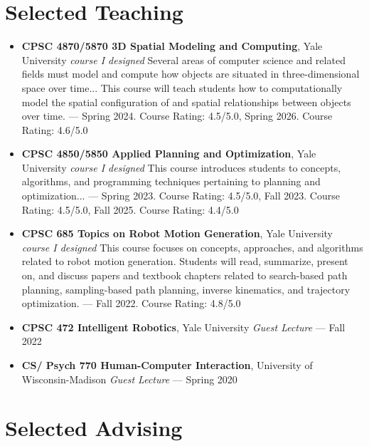 \documentclass[10pt, letterpaper]{article}
\begin{document}
\section*{Selected Teaching}
\begin{itemize}[leftmargin=0pt, label={}, itemsep=0.5em]
    \item \textbf{CPSC 4870/5870 3D Spatial Modeling and Computing}, Yale University \hfill \textit{course I designed}    \newline Several areas of computer science and related fields must model and compute how objects are situated in three-dimensional space over time... This course will teach students how to computationally model the spatial configuration of and spatial relationships between objects over time.                        --- Spring 2024. Course Rating: 4.5/5.0, Spring 2026. Course Rating: 4.6/5.0
                \item \textbf{CPSC 4850/5850 Applied Planning and Optimization}, Yale University \hfill \textit{course I designed}    \newline This course introduces students to concepts, algorithms, and programming techniques pertaining to planning and optimization...                        --- Spring 2023. Course Rating: 4.5/5.0, Fall 2023. Course Rating: 4.5/5.0, Fall 2025. Course Rating: 4.4/5.0
                \item \textbf{CPSC 685 Topics on Robot Motion Generation}, Yale University \hfill \textit{course I designed}    \newline This course focuses on concepts, approaches, and algorithms related to robot motion generation. Students will read, summarize, present on, and discuss papers and textbook chapters related to search-based path planning, sampling-based path planning, inverse kinematics, and trajectory optimization.                        --- Fall 2022. Course Rating: 4.8/5.0
                \item \textbf{CPSC 472 Intelligent Robotics}, Yale University \hfill \textit{Guest Lecture}                            --- Fall 2022
                \item \textbf{CS/ Psych 770 Human-Computer Interaction}, University of Wisconsin-Madison \hfill \textit{Guest Lecture}                            --- Spring 2020
            \end{itemize}

\section*{Selected Advising}
\end{document}
